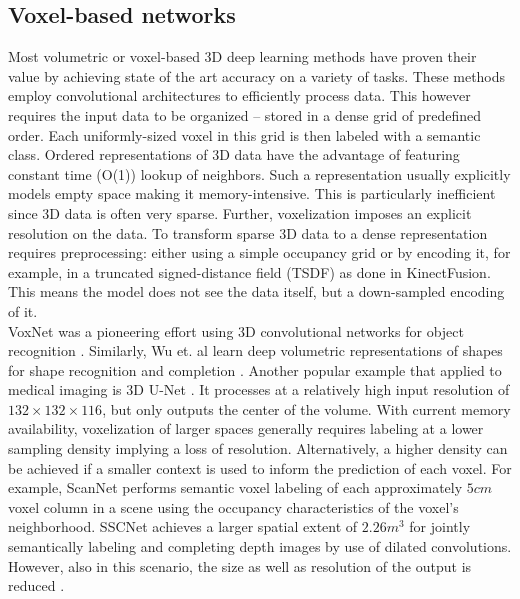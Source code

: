\documentclass[runningheads]{llncs}
\begin{document}
\subsection{Voxel-based networks}
\label{section:voxel-networks}

Most volumetric or voxel-based 3D deep learning methods have proven their value by achieving state of the art accuracy \cite{Dai2017,Maturana2015,Cicek2016,Milletari2016,Song2016} on a variety of tasks. These methods employ convolutional architectures to efficiently process data. This however requires the input data to be organized -- stored in a dense grid of predefined order. Each uniformly-sized voxel in this grid is then labeled with a semantic class. Ordered representations of 3D data have the advantage of featuring constant time (O(1)) lookup of neighbors. Such a representation usually explicitly models empty space making it memory-intensive. This is particularly inefficient since 3D data is often very sparse. Further, voxelization imposes an explicit resolution on the data. To transform sparse 3D data to a dense representation requires preprocessing: either using a simple occupancy grid or by encoding it, for example, in a truncated signed-distance field (TSDF) as done in KinectFusion\cite{Izadi2011,Song2016}. This means the model does not see the data itself, but a down-sampled encoding of it.\\

VoxNet was a pioneering effort using 3D convolutional networks for object recognition \cite{Maturana2015}.
Similarly, Wu et. al learn deep volumetric representations of shapes for shape recognition and completion \cite{Wu2015}. Another popular example that applied to medical imaging is 3D U-Net \cite{Cicek2016}. It processes at a relatively high input resolution of $132 \times 132 \times 116$, but only outputs the center of the volume. With current memory availability, voxelization of larger spaces generally requires labeling at a lower sampling density implying a loss of resolution. Alternatively, a higher density can be achieved if a smaller context is used to inform the prediction of each voxel. For example, ScanNet \cite{Dai2017} performs semantic voxel labeling of each approximately $5cm$ voxel column in a scene using the occupancy characteristics of the voxel's neighborhood.
SSCNet achieves a larger spatial extent of $2.26m^3$ for jointly semantically labeling and completing depth images by use of dilated convolutions. However, also in this scenario, the size as well as resolution of the output is reduced \cite{Song2016}.
\\
\end{document}
